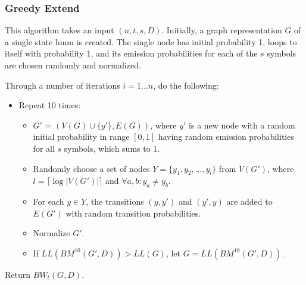 \subsubsection{Greedy Extend}
This algorithm takes an input $(n, t, s, D)$.
Initially, a graph representation $G$ of a single state \gls{hmm} is created. The single node has initial probability 1, loops to itself with probability 1, and its emission probabilities for each of the $s$ symbols are chosen randomly and normalized.

Through a number of iterations $i = 1 ... n$, do the following:
\begin{itemize}
\item Repeat 10 times:
	\begin{itemize}
	\item $G'$ = $(V(G) \cup \{y'\}, E(G))$, where $y'$ is a new node with a random initial probability in range $[0, 1]$ having random emission probabilities for all $s$ symbols, which sums to $1$.
	\item Randomly choose a set of nodes $Y = \{y_1, y_2, ... , y_l\}$ from $V(G')$, where $l = \lceil \log |V(G')| \rceil$ and $\forall a,b: y_a \neq y_b$.
	\item For each $y \in Y$, the transitions $(y, y')$ and $(y', y)$ are added to $E(G')$ with random transition probabilities.
	\item Normalize $G'$.
	\item If $LL(BM^{10}(G', D)) > LL(G)$, let $G =LL(BM^{10}(G', D))$.
	\end{itemize}
\end{itemize}

Return $BW_t(G, D)$.